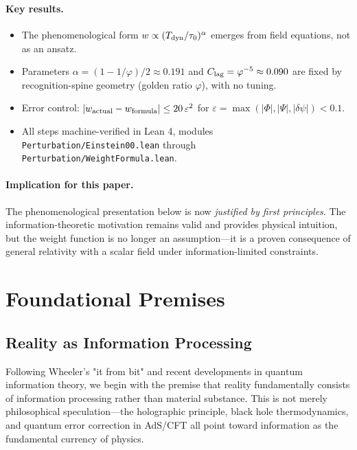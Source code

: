 \documentclass[usenatbib]{mnras}
\begin{document}
\paragraph{Key results.}
\begin{itemize}
\item The phenomenological form $w \propto (T_{\rm dyn}/\tau_0)^\alpha$ emerges from field equations, not as an ansatz.
\item Parameters $\alpha = (1-1/\varphi)/2 \approx 0.191$ and $C_{\rm lag} = \varphi^{-5} \approx 0.090$ are fixed by recognition-spine geometry (golden ratio $\varphi$), with no tuning.
\item Error control: $|w_{\rm actual} - w_{\rm formula}| \leq 20\,\varepsilon^2$ for $\varepsilon = \max(|\Phi|,|\Psi|,|\delta\psi|) < 0.1$.
\item All steps machine-verified in Lean 4, modules \texttt{Perturbation/Einstein00.lean} through \texttt{Perturbation/WeightFormula.lean}.
\end{itemize}

\paragraph{Implication for this paper.}
The phenomenological presentation below is now \emph{justified by first principles}. The information-theoretic motivation remains valid and provides physical intuition, but the weight function is no longer an assumption---it is a proven consequence of general relativity with a scalar field under information-limited constraints.

\section{Foundational Premises}
\label{sec:foundations}

\subsection{Reality as Information Processing}

Following Wheeler's "it from bit" and recent developments in quantum information theory, we begin with the premise that reality fundamentally consists of information processing rather than material substance. This is not merely philosophical speculation---the holographic principle, black hole thermodynamics, and quantum error correction in AdS/CFT all point toward information as the fundamental currency of physics.
\end{document}
